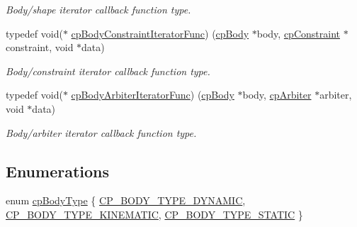 \begin{DoxyCompactItemize}
\begin{DoxyCompactList}\small\item\em Body/shape iterator callback function type. \end{DoxyCompactList}\item 
\mbox{\label{group__cp_body_ga8cacab9a606b0dbb1dad405bb0d7ba12}} 
typedef void($\ast$ \mbox{\hyperlink{group__cp_body_ga8cacab9a606b0dbb1dad405bb0d7ba12}{cp\+Body\+Constraint\+Iterator\+Func}}) (\mbox{\hyperlink{structcp_body}{cp\+Body}} $\ast$body, \mbox{\hyperlink{structcp_constraint}{cp\+Constraint}} $\ast$constraint, void $\ast$data)
\begin{DoxyCompactList}\small\item\em Body/constraint iterator callback function type. \end{DoxyCompactList}\item 
\mbox{\label{group__cp_body_gac655e03d7b2d7fd0a870a702f9de0026}} 
typedef void($\ast$ \mbox{\hyperlink{group__cp_body_gac655e03d7b2d7fd0a870a702f9de0026}{cp\+Body\+Arbiter\+Iterator\+Func}}) (\mbox{\hyperlink{structcp_body}{cp\+Body}} $\ast$body, \mbox{\hyperlink{structcp_arbiter}{cp\+Arbiter}} $\ast$arbiter, void $\ast$data)
\begin{DoxyCompactList}\small\item\em Body/arbiter iterator callback function type. \end{DoxyCompactList}\end{DoxyCompactItemize}
\subsection*{Enumerations}
\begin{DoxyCompactItemize}
\item 
enum \mbox{\hyperlink{group__cp_body_ga3581b128fd3e2734952aeac8545fd5ca}{cp\+Body\+Type}} \{ \mbox{\hyperlink{group__cp_body_gga3581b128fd3e2734952aeac8545fd5caa443c53c7b27e64799ee0eba728e60db6}{C\+P\+\_\+\+B\+O\+D\+Y\+\_\+\+T\+Y\+P\+E\+\_\+\+D\+Y\+N\+A\+M\+IC}}, 
\mbox{\hyperlink{group__cp_body_gga3581b128fd3e2734952aeac8545fd5caa95e6c8d1ff2714d17bc4f2258407e58d}{C\+P\+\_\+\+B\+O\+D\+Y\+\_\+\+T\+Y\+P\+E\+\_\+\+K\+I\+N\+E\+M\+A\+T\+IC}}, 
\mbox{\hyperlink{group__cp_body_gga3581b128fd3e2734952aeac8545fd5caaa594879f082bbabce4bd16944f73456b}{C\+P\+\_\+\+B\+O\+D\+Y\+\_\+\+T\+Y\+P\+E\+\_\+\+S\+T\+A\+T\+IC}}
 \}
\end{DoxyCompactItemize}
